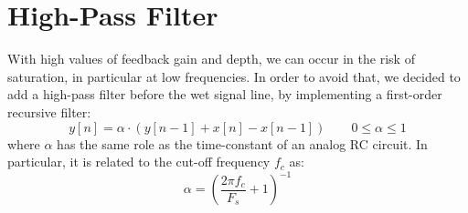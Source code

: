 \section{High-Pass Filter}\label{sec:hpf}

With high values of feedback gain and depth, we can occur in the risk of saturation, in particular at low frequencies. In order to avoid that, we decided to add a high-pass filter before the wet signal line, by implementing a first-order recursive filter:
\[
	y[n] = \alpha \cdot \left( y[n-1] + x[n] - x[n-1] \right)
	\qquad
	0 \le \alpha \le 1
\]
where $\alpha$ has the same role as the time-constant of an analog RC circuit.
In particular, it is related to the cut-off frequency $f_c$ as:
\[
	\alpha = \left( \frac{2 \pi f_c}{F_s} + 1 \right)^{-1}
\]
